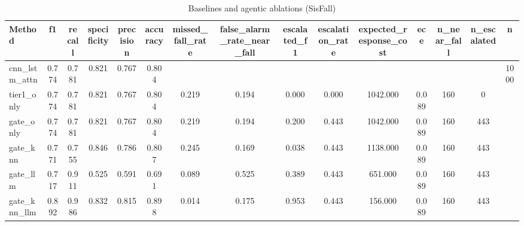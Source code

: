 \begin{table}[t]
\centering
\caption{Baselines and agentic ablations (SisFall)}
\begin{tabular}{lcccccccccccccc}
\toprule
Method & f1 & recall & specificity & precision & accuracy & missed_fall_rate & false_alarm_rate_near_fall & escalated_f1 & escalation_rate & expected_response_cost & ece & n_near_fall & n_escalated & n \\
\midrule
cnn_lstm_attn & 0.774 & 0.781 & 0.821 & 0.767 & 0.804 &  &  &  &  &  &  &  &  & 1000 \\
tier1_only & 0.774 & 0.781 & 0.821 & 0.767 & 0.804 & 0.219 & 0.194 & 0.000 & 0.000 & 1042.000 & 0.089 & 160 & 0 &  \\
gate_only & 0.774 & 0.781 & 0.821 & 0.767 & 0.804 & 0.219 & 0.194 & 0.200 & 0.443 & 1042.000 & 0.089 & 160 & 443 &  \\
gate_knn & 0.771 & 0.755 & 0.846 & 0.786 & 0.807 & 0.245 & 0.169 & 0.038 & 0.443 & 1138.000 & 0.089 & 160 & 443 &  \\
gate_llm & 0.717 & 0.911 & 0.525 & 0.591 & 0.691 & 0.089 & 0.525 & 0.389 & 0.443 & 651.000 & 0.089 & 160 & 443 &  \\
gate_knn_llm & 0.892 & 0.986 & 0.832 & 0.815 & 0.898 & 0.014 & 0.175 & 0.953 & 0.443 & 156.000 & 0.089 & 160 & 443 &  \\
\bottomrule
\end{tabular}
\end{table}